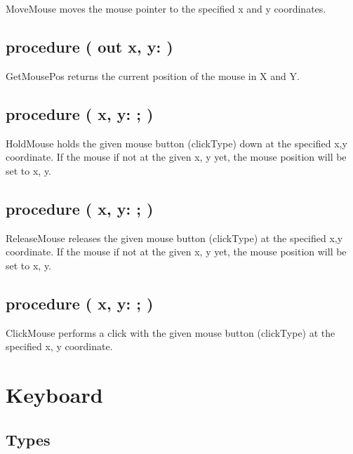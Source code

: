 \documentclass[a4paper]{report}
\begin{document}
MoveMouse moves the mouse pointer to the specified x and y coordinates.

\subsection{\textbf{procedure} {\color{blue}{GetMousePos}}({\color{typeRed}
{out x, y: }}{\color{typeGreen}{Integer}})}

GetMousePos returns the current position of the mouse in X and Y.

\subsection{\textbf{procedure} {\color{blue}{HoldMouse}}({\color{typeRed}
{x, y: }}{\color{typeGreen}{Integer}}; {\color{typeRed}{clickType :}}
{\color{typeGreen}{clickType}})}

HoldMouse holds the given mouse button (clickType) down at the specified x,y 
coordinate. If the mouse if not at the given x, y yet, the mouse position
will be set to x, y.

\subsection{\textbf{procedure} {\color{blue}{ReleaseMouse}}({\color{typeRed}
{x, y: }}{\color{typeGreen}{Integer}}; {\color{typeRed}{clickType :}}
{\color{typeGreen}{clickType}})}

ReleaseMouse releases the given mouse button (clickType) at the specified x,y 
coordinate. If the mouse if not at the given x, y yet, the mouse position
will be set to x, y.

\subsection{\textbf{procedure} {\color{blue}{ClickMouse}}({\color{typeRed}
{x, y: }}{\color{typeGreen}{Integer}}; {\color{typeRed}{clickType :}}
{\color{typeGreen}{clickType}})}

ClickMouse performs a click with the given mouse button (clickType) at the
specified x, y coordinate.

\section{Keyboard}

\subsection{Types}
\end{document}
